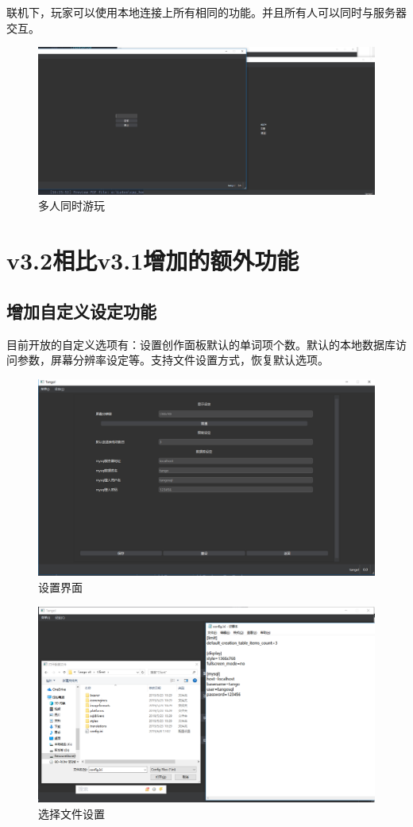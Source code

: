 \documentclass[UTF8]{ctexart}
\begin{document}
\newpage
联机下，玩家可以使用本地连接上所有相同的功能。并且所有人可以同时与服务器交互。\\
\begin{figure}[!ht]
    \centering
    \includegraphics[scale=0.23]{./images/mplay.png}
    \caption{多人同时游玩}
\end{figure}
\section{v3.2相比v3.1增加的额外功能}
\subsection{增加自定义设定功能}
目前开放的自定义选项有：设置创作面板默认的单词项个数。默认的本地数据库访问参数，屏幕分辨率设定等。支持文件设置方式，恢复默认选项。
\begin{figure}[!h]
    \centering
    \includegraphics[scale=0.3]{./images/config.png}
    \caption{设置界面}
\end{figure}
\begin{figure}[!h]
    \centering
    \includegraphics[scale=0.23]{./images/files.png}
    \caption{选择文件设置}
\end{figure}
\end{document}
